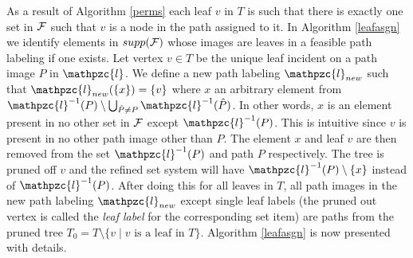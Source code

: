 \documentclass{CRPITStyle} %
\def\cF{{\cal F}}
\def\hP{{\hat P}}
\def\cl{\mathpzc{l}}
\def\xnoindent{} %
\newenvironment{proof}[1][Proof]{\begin{trivlist} %
\item[\hskip \labelsep {\bfseries #1}]}{\end{trivlist}} %
\newcommand{\qed}{\hfill \mbox{\raggedright \rule{.07in}{.1in}}} %
\begin{document}
\begin{proof}
\end{proof}

\xnoindent
As a result of Algorithm \ref{perms} each leaf $v$ in $T$ is such that
there is exactly one set in $\cF$ such that $v$ is a node in the path
assigned to it.  In Algorithm \ref{leafasgn} we identify elements in
$supp(\cF)$ whose images are leaves in a feasible path labeling if one
exists.  Let vertex $v \in T$ be the unique leaf incident on a path
image $P$ in $\cl$.  We define a new path labeling $\cl_{new}$ such
that $\cl_{new}(\{x\}) = \{v\}$ where $x$ an arbitrary element from
$\cl^{-1}(P) \setminus \bigcup_{\hP \ne P} \cl^{-1}(\hP)$. In other
words, $x$ is an element present in no other set in $\cF$ except
$\cl^{-1}(P)$. This is intuitive since $v$ is present in no other path
image other than $P$.  The element $x$ and leaf $v$ are then removed
from the set $\cl^{-1}(P)$ and path $P$ respectively. The tree is
pruned off $v$ and the refined set system will have $\cl^{-1}(P)
\setminus \{x\}$ instead of $\cl^{-1}(P)$. After doing this for all
leaves in $T$, all path images in the new path labeling $\cl_{new}$
except single leaf labels (the pruned out vertex is called the {\em
  leaf label} for the corresponding set item) are paths from the
pruned tree $T_0 = T \setminus \{v \mid v \text{ is a leaf in }
T\}$. Algorithm \ref{leafasgn} is now presented with details.
\end{document}
